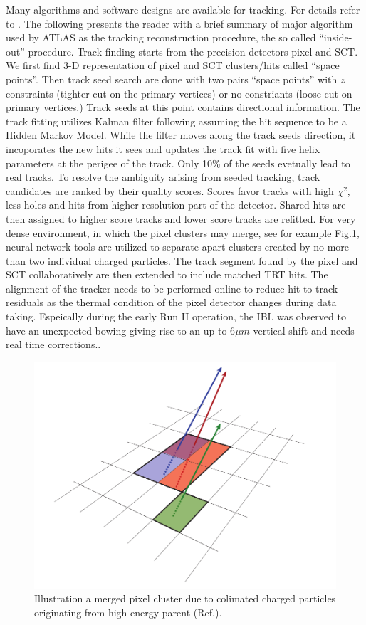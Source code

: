 \label{sec:reco-tracking}
Many algorithms and software designs are available for tracking. For details refer to \cite{Cornelissen:1020106}. The following presents the reader with a brief summary of major algorithm used by ATLAS as the tracking reconstruction procedure, the so called ``inside-out'' procedure. Track finding starts from the precision detectors pixel and SCT. We first find 3-D representation of pixel and SCT clusters/hits called ``space points''. Then track seed search are done with two pairs ``space points'' with $z$ constraints (tighter cut on the primary vertices) or no constriants (loose cut on primary vertices.) Track seeds at this point contains directional information. The track fitting utilizes Kalman filter following assuming the hit sequence to be a Hidden Markov Model. While the filter moves along the track seeds direction, it incoporates the new hits it sees and updates the track fit with five helix parameters at the perigee of the track. Only 10\% of the seeds evetually lead to real tracks. To resolve the ambiguity arising from seeded tracking, track candidates are ranked by their quality scores. Scores favor tracks with high $\chi^2$, less holes and hits from higher resolution part of the detector. Shared hits are then assigned to higher score tracks and lower score tracks are refitted. For very dense environment, in which the pixel clusters may merge, see for example Fig.\ref{fig:reco-trackingcluster}, neural network tools are utilized to separate apart clusters created by no more than two individual charged particles\cite{PERF-2012-05,Aaboud:2017all}. The track segment found by the pixel and SCT collaboratively are then extended to include matched TRT hits. The alignment of the tracker needs to be performed online to reduce hit to track residuals as the thermal condition of the pixel detector changes during data taking. Espeically during the early Run II operation, the IBL was observed to have an unexpected bowing giving rise to an up to 6$\mu m$ vertical shift and needs real time corrections.\cite{tracking-align}.

\begin{figure}[htpb!]
\begin{center}
  \includegraphics[width=0.55\linewidth]{figures/Reco/TrackingClusterB}
  \caption{ Illustration a merged pixel cluster due to colimated charged particles originating from high energy parent (Ref.\cite{Aaboud:2017all}). }
\label{fig:reco-trackingcluster}
\end{center}
\end{figure}


